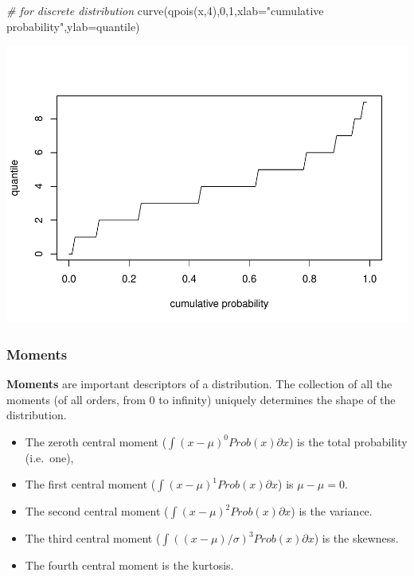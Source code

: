 \documentclass[
]{article}
\newenvironment{Shaded}{\begin{snugshade}}{\end{snugshade}}
\newcommand{\AttributeTok}[1]{\textcolor[rgb]{0.77,0.63,0.00}{#1}}
\newcommand{\CommentTok}[1]{\textcolor[rgb]{0.56,0.35,0.01}{\textit{#1}}}
\newcommand{\DecValTok}[1]{\textcolor[rgb]{0.00,0.00,0.81}{#1}}
\newcommand{\FunctionTok}[1]{\textcolor[rgb]{0.00,0.00,0.00}{#1}}
\newcommand{\NormalTok}[1]{#1}
\newcommand{\StringTok}[1]{\textcolor[rgb]{0.31,0.60,0.02}{#1}}
\providecommand{\tightlist}{%
  \setlength{\itemsep}{0pt}\setlength{\parskip}{0pt}}
\begin{document}
\begin{Shaded}
\begin{Highlighting}[]
    \CommentTok{\# for discrete distribution}
\FunctionTok{curve}\NormalTok{(}\FunctionTok{qpois}\NormalTok{(x,}\DecValTok{4}\NormalTok{),}\DecValTok{0}\NormalTok{,}\DecValTok{1}\NormalTok{,}\AttributeTok{xlab=}\StringTok{"cumulative probability"}\NormalTok{,}\AttributeTok{ylab=}\StringTok{\textquotesingle{}quantile\textquotesingle{}}\NormalTok{)}
\end{Highlighting}
\end{Shaded}

\includegraphics{LECTURE2_files/figure-latex/unnamed-chunk-19-2.pdf}

\hypertarget{moments}{%
\subsubsection{Moments}\label{moments}}

\textbf{Moments} are important descriptors of a distribution. The
collection of all the moments (of all orders, from 0 to infinity)
uniquely determines the shape of the distribution.

\begin{itemize}
\tightlist
\item
  The zeroth central moment
  (\(\int \left ( x-\mu \right )^{0}Prob(x)\partial x\)) is the total
  probability (i.e.~one),\\
\item
  The first central moment
  (\(\int \left ( x-\mu \right )^{1}Prob(x)\partial x\)) is
  \(\mu - \mu = 0\).\\
\item
  The second central moment
  (\(\int \left ( x-\mu \right )^{2}Prob(x)\partial x\)) is the
  variance.\\
\item
  The third central moment
  (\(\int \left ( \left (x-\mu \right )/\sigma \right )^{3}Prob(x)\partial x\))
  is the skewness.\\
\item
  The fourth central moment is the kurtosis.
\end{itemize}
\end{document}
